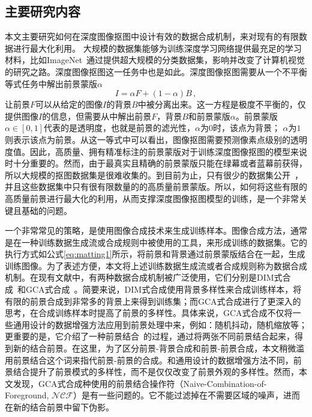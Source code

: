 \documentclass[supercite]{HustGraduPaper}
\begin{document}
	\subsection{主要研究内容}
	本文主要研究如何在深度图像抠图中设计有效的数据合成机制，来对现有的有限数据进行最大化利用。
	大规模的数据集能够为训练深度学习网络提供最充足的学习材料，比如ImageNet~\cite{ImageNet}通过提供超大规模的分类数据集，影响并改变了计算机视觉的研究之路。深度图像抠图这一任务中也是如此。深度图像抠图需要从一个不平衡等式任务中解出前景蒙版$\alpha$
	\begin{equation}
	\label{eq:matting1}
	I = \alpha F+(1-\alpha) B\,,
	\end{equation}
	让前景$F$可以从给定的图像$I$的背景$B$中被分离出来。这一方程是极度不平衡的，仅提供图像$I$的信息，但需要从中解出前景$F$，背景$B$和前景蒙版$\alpha$。前景蒙版$\alpha\in[0,1]$代表的是透明度，也就是前景的滤光性，$\alpha$为$0$时，该点为背景； $\alpha$为$1$则表示该点为前景。从这一等式中可以看出，图像抠图需要预测像素点级别的透明度值。因此，高质量、拥有精准标注的前景蒙版对于训练深度图像抠图的模型来说时十分重要的。然而，由于最真实且精确的前景蒙版只能在绿幕或者蓝幕前获得，所以大规模的抠图数据集是很难收集的。到目前为止，只有很少的数据集公开~\cite{DIM,HATT,AIM}，并且这些数据集中只有很有限数量的的高质量前景蒙版。所以，如何将这些有限的高质量前景进行最大化的利用，从而支撑深度图像抠图模型的训练，是一个非常关键且基础的问题。

	一个非常常见的策略，是使用图像合成技术来生成训练样本。图像合成方法，通常是在一种训练数据生成流或合成规则中被使用的工具，来形成训练的数据集。它的执行方式如公式\ref{eq:matting1}所示，将前景和背景通过前景蒙版结合在一起，生成训练图像。为了表述方便，本文将上述训练数据生成流或者合成规则称为数据合成机制。在现有文献中，有两种数据合成机制被广泛使用，它们分别是DIM式合成~\cite{DIM}和GCA式合成~\cite{GCA}。简要来说，DIM式合成使用背景多样性来合成训练样本，将有限的前景合成到非常多的背景上来得到训练集；而GCA式合成进行了更深入的思考，在合成训练样本时提高了前景的多样性。具体来说，GCA式合成不仅将一些通用设计的数据增强方法应用到前景处理中来，例如：随机抖动，随机缩放等；更重要的是，它介绍了一种前景结合~\cite{LBSampling}的过程，通过将两张不同前景结合起来，得到新的结合前景。在这里，为了区分前景-背景合成和前景-前景合成，本文稍微滥用前景结合这个词来指代前景-前景的合成。和通用设计的数据增强方法不同，前景结合提升了前景模式的多样性，而不是仅仅改变了前景外观的多样性。然而，本文发现，GCA式合成种使用的前景结合操作符（Naive-Combination-of-Foreground, $\mathcal{NCF}$）是有一些问题的。它不能过滤掉在不需要区域的噪声，进而在新的结合前景中留下伪影。
	
\end{document}
